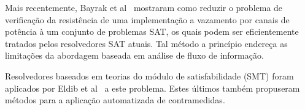 Mais recentemente, Bayrak et al~\cite{BayrakRegazzoniNovo2013, Bayrak2014} mostraram como reduzir o problema de verificação da resistência de uma implementação a vazamento por canais de potência à um conjunto de problemas SAT, os quais podem ser eficientemente tratados pelos resolvedores SAT atuais. Tal método a princípio endereça as limitações da abordagem baseada em análise de fluxo de informação.

%
Resolvedores baseados em teorias do módulo de satisfabilidade (SMT) foram aplicados por Eldib et al~\cite{EldibWang2014, EldibWang2014_QMS, EldibWang2014_SMT, EldibWang2014_sc_sniffer} a este problema. Estes últimos também propuseram métodos para a aplicação automatizada de contramedidas.
